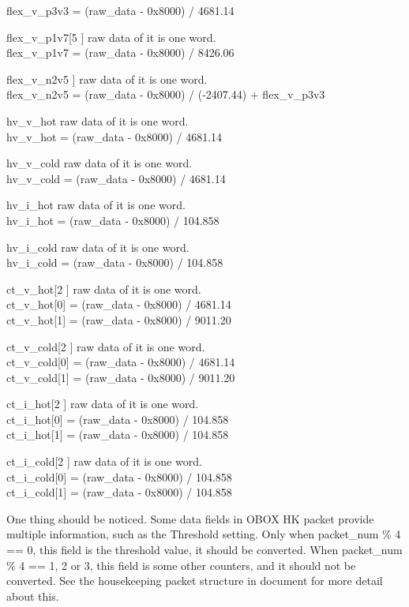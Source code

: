\documentclass[a4paper, 12pt, onecolumn]{article}
\begin{document}
\begin{asparadesc}
  flex\_v\_p3v3 = (raw\_data - 0x8000) / 4681.14
\item[flex\_v\_p1v7[5]] raw data of it is one word. \\
  flex\_v\_p1v7 = (raw\_data - 0x8000) / 8426.06
\item[flex\_v\_n2v5]] raw data of it is one word. \\
  flex\_v\_n2v5 = (raw\_data - 0x8000) / (-2407.44) + flex\_v\_p3v3
\item[hv\_v\_hot] raw data of it is one word. \\
  hv\_v\_hot = (raw\_data - 0x8000) / 4681.14
\item[hv\_v\_cold] raw data of it is one word. \\
  hv\_v\_cold = (raw\_data - 0x8000) / 4681.14
\item[hv\_i\_hot] raw data of it is one word. \\
  hv\_i\_hot = (raw\_data - 0x8000) / 104.858
\item[hv\_i\_cold] raw data of it is one word. \\
  hv\_i\_cold = (raw\_data - 0x8000) / 104.858
\item[ct\_v\_hot[2]] raw data of it is one word. \\
  ct\_v\_hot[0] = (raw\_data - 0x8000) / 4681.14 \\
  ct\_v\_hot[1] = (raw\_data - 0x8000) / 9011.20
\item[ct\_v\_cold[2]] raw data of it is one word. \\
  ct\_v\_cold[0] = (raw\_data - 0x8000) / 4681.14 \\
  ct\_v\_cold[1] = (raw\_data - 0x8000) / 9011.20
\item[ct\_i\_hot[2]] raw data of it is one word. \\
  ct\_i\_hot[0] = (raw\_data - 0x8000) / 104.858 \\
  ct\_i\_hot[1] = (raw\_data - 0x8000) / 104.858 
\item[ct\_i\_cold[2]] raw data of it is one word. \\
  ct\_i\_cold[0] = (raw\_data - 0x8000) / 104.858 \\
  ct\_i\_cold[1] = (raw\_data - 0x8000) / 104.858 
\end{asparadesc}

One thing should be noticed. Some data fields in OBOX HK packet provide multiple information, such as the Threshold setting.
Only when packet\_num \% 4 == 0, this field is the threshold value, it should be converted.
When packet\_num \% 4 == 1, 2 or 3, this field is some other counters, and it should not be converted.
See the housekeeping packet structure in document\cite{POLAR-OBOX-software} for more detail about this.
\end{document}
